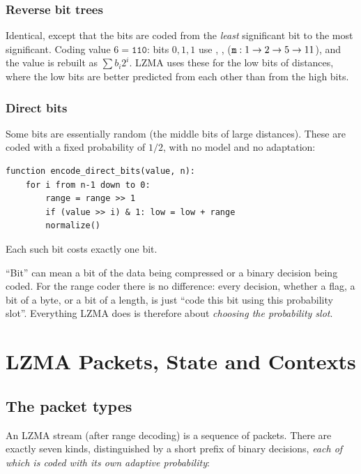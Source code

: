\documentclass[11pt,a4paper,oneside]{book}
\newcommand{\code}[1]{\texttt{\detokenize{#1}}}
\newcommand{\bits}[1]{\texttt{#1}}
\begin{document}
\subsection{Reverse bit trees}
Identical, except that the bits are coded from the \emph{least} significant bit to the most significant. Coding value $6=\bits{110}$:
bits $0,1,1$ use \code{probs[1]}, \code{probs[2]}, \code{probs[5]} ($\code{m}:1\to2\to5\to11$), and the value is rebuilt as $\sum b_i 2^i$.
LZMA uses these for the low bits of distances, where the low bits are better predicted from each other than from the high bits.

\subsection{Direct bits}
Some bits are essentially random (the middle bits of large distances). These are coded with a fixed probability of $1/2$, with no model and no adaptation:
\begin{lstlisting}[language=pseudo]
function encode_direct_bits(value, n):
    for i from n-1 down to 0:
        range = range >> 1
        if (value >> i) & 1: low = low + range
        normalize()
\end{lstlisting}
Each such bit costs exactly one bit.

\begin{pitfall}
``Bit'' can mean a bit of the data being compressed or a binary decision being coded. For the range coder there is no
difference: every decision, whether a flag, a bit of a byte, or a bit of a length, is just ``code this bit using this probability slot''.
Everything LZMA does is therefore about \emph{choosing the probability slot}.
\end{pitfall}

\chapter{LZMA Packets, State and Contexts}

\section{The packet types}

An LZMA stream (after range decoding) is a sequence of packets. There are exactly seven kinds, distinguished by a short
prefix of binary decisions, \emph{each of which is coded with its own adaptive probability}:
\end{document}
